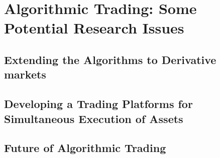 
\chapter{Algorithmic Trading:  Some Potential Research Issues}

\section{Extending the Algorithms to Derivative markets}
\section{Developing a Trading Platforms for Simultaneous Execution of Assets}
\section{Future of Algorithmic Trading}